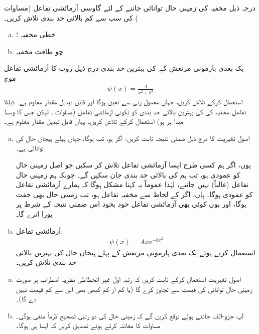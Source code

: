 درجہ ذیل مخفیہ کی  زمینی حال توانائی جاننے کے لئے   گاوسی آزمائشی تفاعل (مساوات )  کی سب  سے کم بالائی حد بندی تلاش کریں۔
\begin{enumerate}[a.]
\item
 خطی مخفیہ ؛
\item
 چو طاقت  مخفیہ 
\end{enumerate}
 یک بعدی ہارمونی مرتعش  کے      کی بہترین حد بندی  درج ذیل روپ کا  آزمائشی تفاعل موج
\begin{align*}
\psi(x)=\frac{A}{x^{2}+b^{2}} 
\end{align*}
 استعمال کرکے تلاش کریں، جہاں   معمول زنی سے تعین ہوگا  اور   قابل تبدیل مقدار معلوم ہے۔
 ڈیلٹا تفاعل مخفیہ     کی   کی بہترین بالائی حد بندی کو تکونی آزمائشی تفاعل (مساوات  ،  لیکن جس کا وسط مبدا پر ہو)  استعمال کرکے تلاش کریں۔  یہاں   قابل تبدیل مقدار معلوم ہے۔
\begin{enumerate}[a.]
\item
 اصول تغیریت کا  درج ذیل ضمنی  نتیجہ  ثابت کریں: اگر  ہو، تب  ہوگا،  جہاں پہلے  ہیجان حال کی توانائی    ہے۔ 
 
 یوں، اگر ہم کسی طرح   ایسا    آزمائشی تفاعل تلاش  کر  سکیں جو  اصل زمینی حال کو عمودی ہو، تب ہم   کی بالائی حد بندی جان سکیں گے۔  چونکہ ہم  زمینی حال تفاعل     (غالباً) نہیں جانتے،  لہٰذا عموماً  یہ کہنا مشکل ہوگا کہ      ہمارے آزمائشی تفاعل  کو عمودی ہوگا۔ ہاں،  اگر  کے لحاظ سے مخفیہ          تفاعل ہو،  تب زمینی حال بھی جفت ہوگا، اور یوں  کوئی بھی  آزمائشی تفاعل خود بخود اس    ضمنی  نتیجہ کے شرط پر پورا اترے گا۔
 \item
   آزمائشی تفاعل:
\begin{align*}
\psi(x)=Axe^{-bx^{2}} 
\end{align*}
 استعمال کرتے ہوئے یک بعدی ہارمونی مرتعش کے پہلے  ہیجان حال کی  بہترین بالائی حد بندی تلاش کریں۔
 \end{enumerate}
\begin{enumerate}[a.]
\item
 اصول تغیریت استعمال کرکے ثابت کریں کہ رتبہ اول غیر انحطاطی نظریہ اضطراب ہر صورت زمینی حال توانائی کی قیمت سے تجاوز کرے گا   (یا کم از  کم کبھی بھی اس سے کم قیمت نہیں دے گا)۔
 \item
  آپ جزو-الف جانتے ہوئے توقع کریں گے کہ زمینی حال کی دو رتبی تصحیح لازماً منفی ہوگی۔ مساوات   کا معائنہ کرتے ہوئے تصدیق کریں کہ ایسا ہی ہوگا۔
  \end{enumerate}

